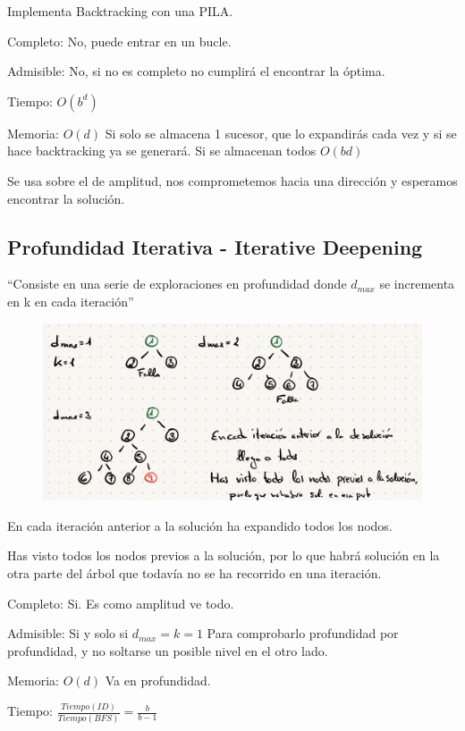 \documentclass[12pt, twoside, openright]{report} %
\begin{document}
	Implementa Backtracking con una PILA.

	Completo: No, puede entrar en un bucle.

	Admisible: No, si no es completo no cumplirá el encontrar la óptima.

	Tiempo: \(O(b^d)\)

	Memoria: \(O(d)\) Si solo se almacena 1 sucesor, que lo expandirás
    cada vez y si se hace backtracking ya se generará. Si se almacenan
    todos \(O(bd)\)
  
    Se usa sobre el de amplitud, nos comprometemos hacia una dirección y
    esperamos encontrar la solución.

	
\subsection{Profundidad Iterativa - Iterative Deepening}

  ``Consiste en una serie de exploraciones en profundidad donde
  \(d_{max}\) se incrementa en k en cada iteración''
  \begin{figure}[H]
	{\includegraphics[scale=.3]{Untitled 49.png}}
\end{figure}


    En cada iteración anterior a la solución ha expandido todos los
    nodos.

	Has visto todos los nodos previos a la solución, por lo que habrá
    solución en la otra parte del árbol que todavía no se ha recorrido
    en una iteración.

	Completo: Si. Es como amplitud ve todo.

	Admisible: Si y solo si \(d_{max}=k=1\) Para comprobarlo profundidad
    por profundidad, y no soltarse un posible nivel en el otro lado.

	Memoria: \(O(d)\) Va en profundidad.

	Tiempo: \(\frac {Tiempo (ID)} {Tiempo(BFS)} =\frac {b} {b-1}\)
\end{document}

